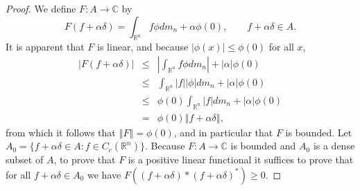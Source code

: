 \documentclass{article}
\newcommand{\norm}[1]{\left\Vert #1 \right\Vert}
\theoremstyle{definition}
\begin{document}
\begin{proof}
We define  $F:A \to \mathbb{C}$ by
\[
F(f+\alpha \delta) = \int_{\mathbb{R}^n} f \phi dm_n + \alpha \phi(0), \qquad f+\alpha \delta \in A.
\]
It is apparent that $F$ is linear, and because $|\phi(x)|\leq \phi(0)$ for all $x$,
\begin{eqnarray*}
|F(f+\alpha \delta)|&\leq&\left| \int_{\mathbb{R}^n} f\phi dm_n\right| + |\alpha| \phi(0)\\
&\leq&\int_{\mathbb{R}^n} |f| |\phi| dm_n + |\alpha| \phi(0)\\
&\leq&\phi(0) \int_{\mathbb{R}^n} |f| dm_n + |\alpha| \phi(0)\\
&=&\phi(0) \norm{f+\alpha \delta},
\end{eqnarray*}
from which it follows that $\norm{F} = \phi(0)$, and in particular that $F$ is bounded.
Let $A_0=\{f+\alpha \delta \in A: f \in C_c(\mathbb{R}^n)\}$. Because $F:A \to \mathbb{C}$ is bounded and $A_0$ is a dense subset
of $A$, to prove that $F$ is a positive linear functional it suffices to prove that for all $f+\alpha \delta \in A_0$ we have
$F((f+\alpha \delta)*(f+\alpha\delta)^*) \geq 0$.


\end{proof}
\end{document}
